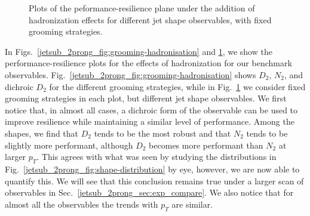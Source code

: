\documentclass[11pt]{cernrep}
\begin{document}
\begin{figure}
  \caption{Plots of the peformance-resilience plane under the addition of hadronization effects for different jet shape observables, with fixed grooming strategies.}\label{jetsub_2prong_fig:shapes-hadronisation}
\end{figure}


In Figs.~\ref{jetsub_2prong_fig:grooming-hadronisation} and
\ref{jetsub_2prong_fig:shapes-hadronisation}, we show the
performance-resilience plots for the effects of hadronization for our
benchmark observables.
%
Fig.~\ref{jetsub_2prong_fig:grooming-hadronisation} shows $D_2$, $N_2$, and dichroic $D_2$ for the different grooming strategies, while in Fig.~\ref{jetsub_2prong_fig:shapes-hadronisation} we consider fixed grooming strategies in each plot, but different jet shape observables.
%
We first notice that, in almost all cases, a dichroic form of the observable can be used to improve resilience while maintaining a similar level of performance.
%
Among the shapes, we find that $D_2$ tends to be the most robust and
that $N_2$ tends to be slightly more performant, although $D_2$
becomes more performant than $N_2$ at larger $p_T$.
%
This agrees with what was seen by studying the distributions in Fig.~\ref{jetsub_2prong_fig:shape-distribution} by eye, however, we are now able to quantify this.
%
We will see that this conclusion remains true under a larger scan of observables in Sec.~\ref{jetsub_2prong_sec:exp_compare}.
%
We also notice that for almost all the observables the trends with $p_T$ are similar.
\end{document}
